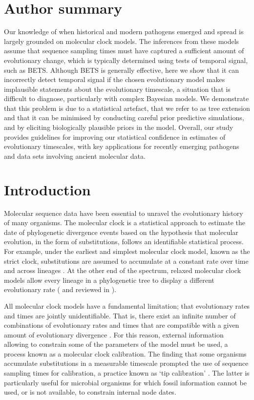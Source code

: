 \documentclass[10pt,letterpaper]{article}
\begin{document}
\section*{Author summary}
Our knowledge of when historical and modern pathogens emerged and spread is largely grounded on molecular clock models. The inferences from these models assume that sequence sampling times must have captured a sufficient amount of evolutionary change, which is typically determined using tests of temporal signal, such as BETS. Although BETS is generally effective, here we show that it can incorrectly detect temporal signal if the chosen evolutionary model makes implausible statements about the evolutionary timescale, a situation that is difficult to diagnose, particularly with complex Bayesian models. We demonstrate that this problem is due to a statistical artefact, that we refer to as tree extension and that it can be minimised by conducting careful prior predictive simulations, and by eliciting biologically plausible priors in the model. Overall, our study provides guidelines for improving our statistical confidence in estimates of evolutionary timescales, with key applications for recently emerging pathogens and data sets involving ancient molecular data.

\linenumbers

\section*{Introduction}
Molecular sequence data have been essential to unravel the evolutionary history of many organisms. The molecular clock is a statistical approach to estimate the date of phylogenetic divergence events based on the hypothesis that molecular evolution, in the form of substitutions, follows an identifiable statistical process. For example, under the earliest and simplest molecular clock model, known as the strict clock, substitutions are assumed to accumulate at a constant rate over time and across lineages \cite{zuckerkandl1965evolutionary}. At the other end of the spectrum, relaxed molecular clock models allow every lineage in a phylogenetic tree to display a different evolutionary rate (\cite{drummond2006relaxed} and reviewed in \cite{ho2014molecular}). 

All molecular clock models have a fundamental limitation; that evolutionary rates and times are jointly unidentifiable. That is, there exist an infinite number of combinations of evolutionary rates and times that are compatible with a given amount of evolutionary divergence \cite{yang2006bayesian,dos2013unbearable}. For this reason, external information allowing to constrain some of the parameters of the model must be used, a process known as a molecular clock calibration. The finding that some organisms accumulate substitutions in a measurable timescale prompted the use of sequence sampling times for calibration, a practice known as `tip calibration' \cite{rodrigo1999coalescent, korber2000timing}. The latter is particularly useful for microbial organisms for which fossil information cannot be used, or is not available, to constrain internal node dates. 
\end{document}
